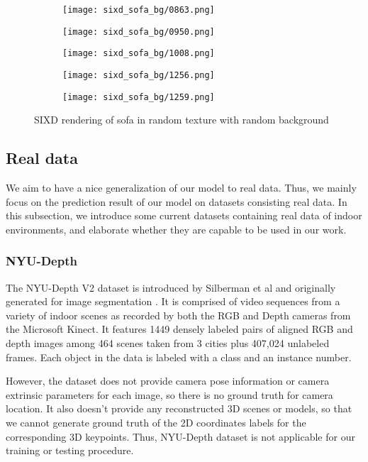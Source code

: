 \begin{figure}[h!]
\begin{subfigure}[b]{0.32\linewidth}
  \end{subfigure}
  \begin{subfigure}[b]{0.32\linewidth}
    \texttt{[image: sixd\_sofa\_bg/0863.png]}
  \end{subfigure}
  \begin{subfigure}[b]{0.32\linewidth}
    \texttt{[image: sixd\_sofa\_bg/0950.png]}
  \end{subfigure}
  \begin{subfigure}[b]{0.32\linewidth}
    \texttt{[image: sixd\_sofa\_bg/1008.png]}
  \end{subfigure}
  \begin{subfigure}[b]{0.32\linewidth}
    \texttt{[image: sixd\_sofa\_bg/1256.png]}
  \end{subfigure}
  \begin{subfigure}[b]{0.32\linewidth}
    \texttt{[image: sixd\_sofa\_bg/1259.png]}
  \end{subfigure}
  \caption{SIXD rendering of sofa in random texture with random background}
  \label{fig:sixd_sofa_bg}
\end{figure}

\subsection{Real data}
We aim to have a nice generalization of our model to real data. Thus, we mainly focus on the prediction result of our model on datasets consisting real data. In this subsection, we introduce some current datasets containing real data of indoor environments, and elaborate whether they are capable to be used in our work.

\subsubsection{NYU-Depth}
The NYU-Depth V2 dataset is introduced by Silberman et al and originally generated for image segmentation \cite{Silberman:ECCV12}. It is comprised of video sequences from a variety of indoor scenes as recorded by both the RGB and Depth cameras from the Microsoft Kinect. It features 1449 densely labeled pairs of aligned RGB and depth images among 464 scenes taken from 3 cities plus 407,024 unlabeled frames. Each object in the data is labeled with a class and an instance number.

However, the dataset does not provide camera pose information or camera extrinsic parameters for each image, so there is no ground truth for camera location. It also doesn't provide any reconstructed 3D scenes or models, so that we cannot generate ground truth of the 2D coordinates labels for the corresponding 3D keypoints. Thus, NYU-Depth dataset is not applicable for our training or testing procedure.

